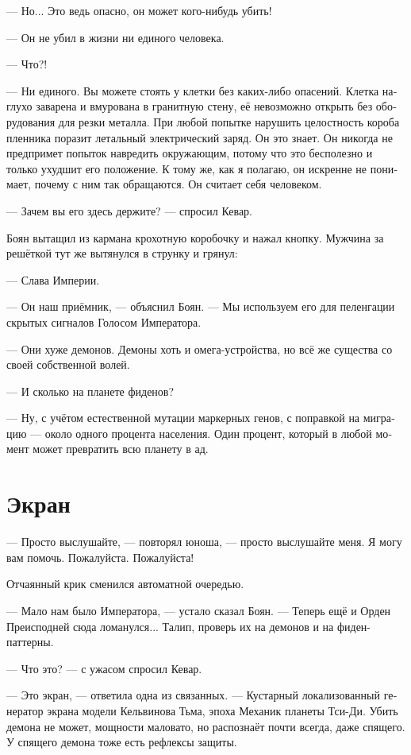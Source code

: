 \documentclass[a4paper,12pt,fleqn]{book}\usepackage{polyglossia}\setdefaultlanguage[babelshorthands=true]{russian}\setotherlanguage{english}\defaultfontfeatures{Ligatures=TeX,Mapping=tex-text}
\newcommand{\asterism}{\vspace{1em}{\centering\Large\bfseries$\ast~\ast~\ast$\par}\vspace{1em}}
\begin{document}
--- Но...
Это ведь опасно, он может кого-нибудь убить!

--- Он не убил в жизни ни единого человека.

--- Что?!

--- Ни единого.
Вы можете стоять у клетки без каких-либо опасений.
Клетка наглухо заварена и вмурована в гранитную стену, её невозможно открыть без оборудования для резки металла.
При любой попытке нарушить целостность короба пленника поразит летальный электрический заряд.
Он это знает.
Он никогда не предпримет попыток навредить окружающим, потому что это бесполезно и только ухудшит его положение.
К тому же, как я полагаю, он искренне не понимает, почему с ним так обращаются.
Он считает себя человеком.

--- Зачем вы его здесь держите? --- спросил Кевар.

Боян вытащил из кармана крохотную коробочку и нажал кнопку.
Мужчина за решёткой тут же вытянулся в струнку и грянул:

--- Слава Империи.

--- Он наш приёмник, --- объяснил Боян.
--- Мы используем его для пеленгации скрытых сигналов Голосом Императора.

\asterism

--- Они хуже демонов.
Демоны хоть и омега-устройства, но всё же существа со своей собственной волей.

--- И сколько на планете фиденов?

--- Ну, с учётом естественной мутации маркерных генов, с поправкой на миграцию --- около одного процента населения.
Один процент, который в любой момент может превратить всю планету в ад.

\section{Экран}

--- Просто выслушайте, --- повторял юноша, --- просто выслушайте меня.
Я могу вам помочь.
Пожалуйста.
Пожалуйста!

Отчаянный крик сменился автоматной очередью.

--- Мало нам было Императора, --- устало сказал Боян.
--- Теперь ещё и Орден Преисподней сюда ломанулся...
Талип, проверь их на демонов и на фиден-паттерны.

--- Что это? --- с ужасом спросил Кевар.

--- Это экран, --- ответила одна из связанных.
--- Кустарный локализованный генератор экрана модели Кельвинова Тьма, эпоха Механик планеты Тси-Ди.
Убить демона не может, мощности маловато, но распознаёт почти всегда, даже спящего.
У спящего демона тоже есть рефлексы защиты.
\end{document}
